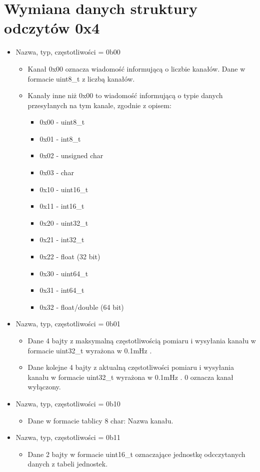 \documentclass{article}
\begin{document}
\section*{Wymiana danych struktury odczytów 0x4}
\begin{itemize}
    \item Nazwa, typ, częstotliwości = 0b00
    \begin{itemize}
    \item Kanał 0x00 oznacza wiadomość informującą o liczbie kanałów. 
    Dane w formacie uint8\_t z liczbą kanałów.
    \item Kanały inne niż 0x00 to wiadomość informującą o typie danych przesyłanych na tym kanale, zgodnie z opisem:
    \begin{itemize}
        \item 0x00 - uint8\_t
        \item 0x01 - int8\_t
        \item 0x02 - unsigned char
        \item 0x03 - char
        \item 0x10 - uint16\_t
        \item 0x11 - int16\_t
        \item 0x20 - uint32\_t
        \item 0x21 - int32\_t
        \item 0x22 - float (32 bit)
        \item 0x30 - uint64\_t
        \item 0x31 - int64\_t
        \item 0x32 - float/double (64 bit)
    \end{itemize}
    \end{itemize}
    \item Nazwa, typ, częstotliwości = 0b01
        \begin{itemize}
            \item Dane 4 bajty z maksymalną częstotliwością pomiaru i wysyłania kanału w formacie uint32\_t wyrażona w 0.1mHz .

            \item Dane kolejne 4 bajty z aktualną częstotliwości pomiaru i wysyłania kanału w formacie uint32\_t wyrażona w 0.1mHz . 0 oznacza kanał wyłączony.
        \end{itemize}
    \item Nazwa, typ, częstotliwości = 0b10
    \begin{itemize}
    \item Dane w formacie tablicy 8 char: Nazwa kanału.
    \end{itemize}
    
    \item Nazwa, typ, częstotliwości = 0b11
    \begin{itemize}
    \item Dane 2 bajty w formacie uint16\_t oznaczające jednostkę odcczytanych danych z tabeli jednostek.
    \end{itemize}
\end{itemize}
\end{document}
